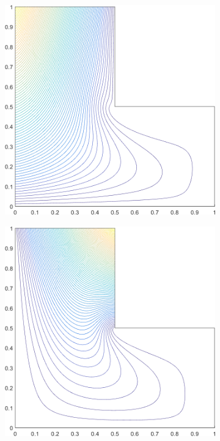 \begin{figure}
\centering
	\begin{subfigure}[b]{0.39\textwidth}
		\centering
		\includegraphics[width=\textwidth]{figures/sec_BF/L-domain_MAXENT1_contour_b6.png}
		\caption{}
	\end{subfigure}
	\hspace{1.5cm}
	\begin{subfigure}[b]{0.39\textwidth}
		\centering
		\includegraphics[width=\textwidth]{figures/sec_BF/L-domain_MAXENT1_contour_b5.png}

\end{subfigure}
\end{figure}

